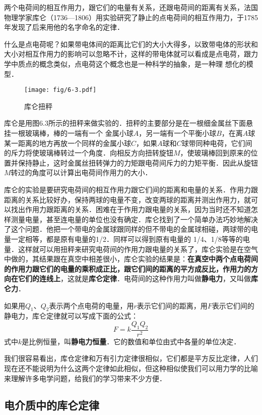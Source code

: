 两个电荷间的相互作用力，跟它们的电量有关系，还跟电荷间的距离有关系，法国物理学家库仑（1736—1806）用实验研究了静止的点电荷间的相互作用力，于1785年发现了后来用他的名字命名的定律．

什么是点电荷呢？如果带电体间的距离比它们的大小大得多，以致带电体的形状和大小对相互作用力的影响可以忽略不计，这样的带电体就可以看成是点电荷，跟力学中质点的概念类似，点电荷这个概念也是一种科学的抽象，是一种理
想化的模型．

\begin{figure}[htp]\centering
	\texttt{[image: fig/6-3.pdf]}
	\caption{库仑扭秤}
	\end{figure}

库仑是用图6.3所示的扭秤来做实验的．扭秤的主要部分是在一根细金属丝下面悬挂一根玻璃棒，棒的一端有一个
金属小球$A$，另一端有一个平衡小球$B$，在离$A$球某一距离的地方再放一个同样的金属小球$C$，如果$A$球和$C$球带同种电荷，它们间的斥力将使玻璃棒转过一个角度．向相反方向扭转旋钮$M$，使玻璃棒回到原来的位置并保持静止，这时金属丝扭转弹力的力矩跟电荷间斥力的力矩平衡．因此从旋钮$M$转过的角度可以计算出电荷间作用力的大小．

库仑的实验是要研究电荷间的相互作用力跟它们间的距离和电量的关系．作用力跟距离的关系比较好办，保持两球的电量不变，改变两球的距离并测出作用力，就可以找出作用力跟距离的关系．困难在于作用力跟电量的关系，因为当时还不知道怎样测量电量，甚至连电量的单位也没有确定．库仑找到了一个简单办法巧妙地解决了这个问题．他把一个带电的金属球跟同样的但不带电的金属球相碰，两球带的电量一定相等，都是原有电量的1/2．同样可以得到原有电量的
1/4、1/8等等的电量．这样就可以用扭秤来研究电荷间的作用力跟电量的关系了，库仑实验是在空气中做的，其结果跟在真空中相差很小，库仑实验的结果是：\textbf{在真空中两个点电荷间的作用力跟它们的电量的乘积成正比，跟它们间的距离的平方成反比，作用力的方向在它们的连线上}，这就是\textbf{库仑定律}．电荷间的这种作用力叫做\textbf{静电力}，又叫做\textbf{库仑力}．

如果用$Q_1$、$Q_2$表示两个点电荷的电量，用$r$表示它们间的距离，用$F$表示它们间的静电力，库仑定律就可以写成下面的公式：
\begin{equation}
F=k\frac{Q_1Q_2}{r^2}
\end{equation}
式中$k$是比例恒量，叫\textbf{静电力恒量}．它的数值和单位由式中各量的单位决定．

我们很容易看出，库仓定律和万有引力定律很相似，它们都是平方反比定律，人们现在还不能说明为什么这两个定律如此相似，但这种相似使我们可以用力学的比喻来理解许多电学问题，给我们的学习带来不少方便．

\subsection{电介质中的库仑定律} 

